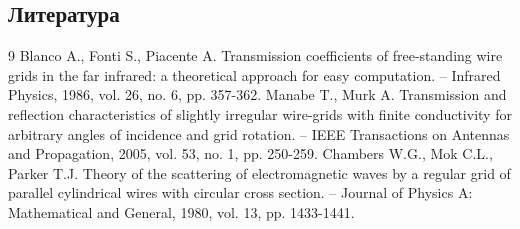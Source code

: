 \subsection*{Литература}
\begin{thebibliography}{9}
	 Blanco A., Fonti S., Piacente A. Transmission coefficients of free-standing wire grids in the far infrared: a theoretical approach for easy computation. – Infrared Physics, 1986, vol. 26, no. 6, pp. 357-362.
	 Manabe T., Murk A. Transmission and reflection characteristics of slightly irregular wire-grids with finite conductivity for arbitrary angles of incidence and grid rotation. – IEEE Transactions on Antennas and Propagation, 2005, vol. 53, no. 1, pp. 250-259.
	 Chambers W.G., Mok C.L., Parker T.J. Theory of the scattering of electromagnetic waves by a regular grid of parallel cylindrical wires with circular cross section. – Journal of Physics A: Mathematical and General, 1980, vol. 13, pp. 1433-1441.
\end{thebibliography}
